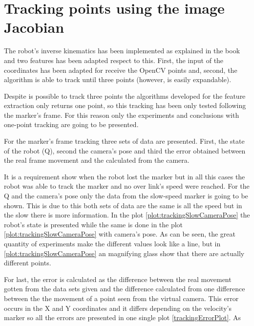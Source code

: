 

\chapter{Tracking points using the image Jacobian} %
\label{chap:tracking_points_using_the_image_jacobian}
The robot's inverse kinematics has been implemented as explained in the book and two features has been adapted respect to this. 
First, the input of the coordinates has been adapted for receive the OpenCV points and, second, the algorithm is able to track until three points (however, is easily expandable).

Despite is possible to track three points the algorithms developed for the feature extraction only returns one point, so this tracking has been only tested following the marker's frame. 
For this reason only the experiments and conclusions with one-point tracking are going to be presented.

For the marker's frame tracking three sets of data are presented. 
First, the state of the robot (Q), second the camera's pose and third the error obtained between the real frame movement and the calculated from the camera.

It is a requirement show when the robot lost the marker but in all this cases the robot was able to track the marker and no over link's speed were reached. 
For the Q and the camera's pose only the data from the slow-speed marker is going to be shown. 
This is due to this both sets of data are the same is all the speed but in the slow there is more information.
In the plot \ref{plot:trackingSlowCameraPose} the robot's state is presented while the same is done in the plot \ref{plot:trackingSlowCameraPose} with camera's pose.
\trackingSlowQRobotPlot
\trackingSlowCameraPose
As can be seen, the great quantity of experiments make the different values look like a line, but in \ref{plot:trackingSlowCameraPose} an magnifying glass show that there are actually different points.

For last, the error is calculated as the difference between the real movement gotten from the data sets given and the difference calculated from one difference between the the movement of a point seen from the virtual camera.
This error occurs in the X and Y coordinates and it differs depending on the velocity's marker so all the errors are presented in one single plot \ref{trackingErrorPlot}.
\trackingErrorPlot
As

